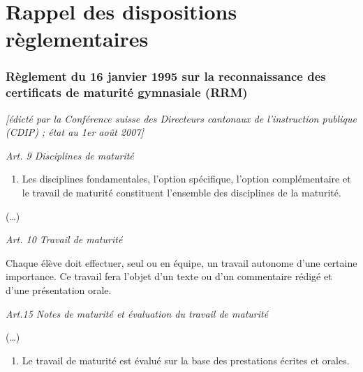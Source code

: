 \documentclass[
  10pt,
  french,
  a5paper,
  openany]{book}
\providecommand{\tightlist}{%
  \setlength{\itemsep}{0pt}\setlength{\parskip}{0pt}}
\begin{document}
\hypertarget{rappel-des-dispositions-ruxe8glementaires}{%
\chapter*{Rappel des dispositions règlementaires}\label{rappel-des-dispositions-ruxe8glementaires}}

\hypertarget{ruxe8glement-du-16-janvier-1995-sur-la-reconnaissance-des-certificats-de-maturituxe9-gymnasiale-rrm}{%
\subsection*{Règlement du 16 janvier 1995 sur la reconnaissance des certificats de maturité gymnasiale (RRM)}\label{ruxe8glement-du-16-janvier-1995-sur-la-reconnaissance-des-certificats-de-maturituxe9-gymnasiale-rrm}}

\emph{{[}édicté par la Conférence suisse des Directeurs cantonaux de l'instruction publique (CDIP) ; état au 1er août 2007{]}}


\emph{Art. 9 Disciplines de maturité}

\begin{enumerate}
\def\labelenumi{\arabic{enumi}.}
\tightlist
\item
  Les disciplines fondamentales, l'option spécifique, l'option complémentaire et le travail de maturité constituent l'ensemble des disciplines de la maturité.
\end{enumerate}

(\ldots)


\emph{Art. 10 Travail de maturité}

Chaque élève doit effectuer, seul ou en équipe, un travail autonome d'une certaine importance. Ce travail fera l'objet d'un texte ou d'un commentaire rédigé et d'une présentation orale.


\emph{Art.15 Notes de maturité et évaluation du travail de maturité}

(\ldots)

\begin{enumerate}
\def\labelenumi{\arabic{enumi}.}
\setcounter{enumi}{1}
\tightlist
\item
  Le travail de maturité est évalué sur la base des prestations écrites et orales.
\end{enumerate}
\end{document}
